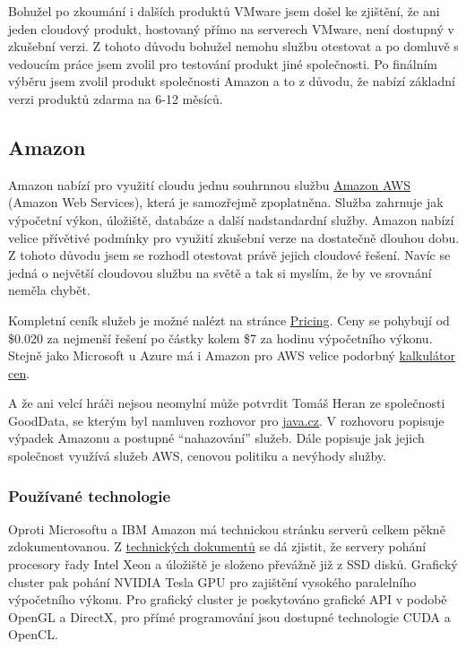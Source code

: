 Bohužel po zkoumání i dalších produktů VMware jsem došel ke zjištění, že ani jeden cloudový produkt, hostovaný přímo na serverech VMware, není dostupný v zkušební verzi. Z tohoto důvodu bohužel nemohu službu otestovat a po domluvě s vedoucím práce jsem zvolil pro testování produkt jiné společnosti. Po finálním výběru jsem zvolil produkt společnosti Amazon a to z důvodu, že nabízí základní verzi produktů zdarma na 6-12 měsíců.

\subsection{Amazon}
Amazon nabízí pro využití cloudu jednu souhrnnou službu \href{http://aws.amazon.com/}{Amazon AWS\cite{amazon:aws}} (Amazon Web Services), která je samozřejmě zpoplatněna. Služba zahrnuje jak výpočetní výkon, úložiště, databáze a další nadstandardní služby. Amazon nabízí velice přívětivé podmínky pro využití zkušební verze na dostatečně dlouhou dobu. Z tohoto důvodu jsem se rozhodl otestovat právě jejich cloudové řešení. Navíc se jedná o největší cloudovou službu na světě a tak si myslím, že by ve srovnání neměla chybět.

Kompletní ceník služeb je možné nalézt na stránce \href{http://aws.amazon.com/ec2/pricing/}{Pricing\cite{amazon:ec2Pricing}}. Ceny se pohybují od \$0.020 za nejmenší řešení po částky kolem \$7 za hodinu výpočetního výkonu. Stejně jako Microsoft u Azure má i Amazon pro AWS velice podorbný \href{http://calculator.s3.amazonaws.com/index.html}{kalkulátor cen\cite{amazon:calculator}}.

A že ani velcí hráči nejsou neomylní může potvrdit Tomáš Heran ze společnosti GoodData, se kterým byl namluven rozhovor pro \href{http://www.java.cz/article/czpodcast-56-cloud-aws}{java.cz\cite{java:aws}}. V rozhovoru popisuje výpadek Amazonu a postupné "`nahazování"' služeb. Dále popisuje jak jejich společnost využívá služeb AWS, cenovou politiku a nevýhody služby.

\subsubsection{Používané technologie}
Oproti Microsoftu a IBM Amazon má technickou stránku serverů celkem pěkně zdokumentovanou. Z \href{http://aws.amazon.com/ec2/instance-types/}{technických dokumentů\cite{amazon:ec2Instances}} se dá zjistit, že servery pohání procesory řady Intel Xeon a úložiště je složeno převážně již z SSD disků. Grafický cluster pak pohání NVIDIA Tesla GPU pro zajištění vysokého paralelního výpočetního výkonu. Pro grafický cluster je poskytováno grafické API v podobě OpenGL a DirectX, pro přímé programování jsou dostupné technologie CUDA a OpenCL.

